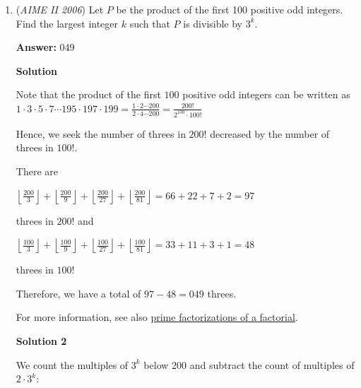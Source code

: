 \begin{enumerate}
Triangle Inequality on the upper bound of $n$ yields $n < 900$, which is when $\log(n) > \log(75), \log(12)$, say case 1. For the lower bound, we have that $\log(12) < \log(75)$ so case 2 is when $\log(75)$ is the longest side, hence $n > 6.25$. Otherwise, we cannot have $n > \frac{12}{75}$ as the lower bound because $\log(12)$ can never be the longest side of a triangle with another side $\log(75)$. Hence we continue by counting integral values $n \in [7,899]$ which is $\boxed{893}$.

 


	\item (\textit{AIME II 2006}) Let $P$ be the product of the first 100 positive odd integers. Find the largest integer $k$ such that $P$ is divisible by $3^k$.


 
 \textbf{Answer: }049



\textbf{Solution}

Note that the product of the first $100$ positive odd integers can be written as $1\cdot 3\cdot 5\cdot 7\cdots 195\cdot 197\cdot 199=\frac{1\cdot 2\cdots200}{2\cdot4\cdots200} = \frac{200!}{2^{100}\cdot 100!}$

 Hence, we seek the number of threes in $200!$ decreased by the number of threes in $100!.$

 There are 

 $\left\lfloor \frac{200}{3}\right\rfloor+\left\lfloor\frac{200}{9}\right\rfloor+\left\lfloor \frac{200}{27}\right\rfloor+\left\lfloor\frac{200}{81}\right\rfloor =66+22+7+2=97$

 threes in $200!$ and 

 $\left\lfloor \frac{100}{3}\right\rfloor+\left\lfloor\frac{100}{9}\right\rfloor+\left\lfloor \frac{100}{27}\right\rfloor+\left\lfloor\frac{100}{81}\right\rfloor=33+11+3+1=48$

 threes in $100!$

 Therefore, we have a total of $97-48=\boxed{049}$ threes.

 For more information, see also \href{https://artofproblemsolving.com/wiki/index.php?title=Factorial\#Prime\_factorization}{ prime factorizations of a factorial}.

 


 



\textbf{Solution 2}

We count the multiples of $3^k$ below 200 and subtract the count of multiples of $2\cdot 3^k$:


\end{enumerate}
